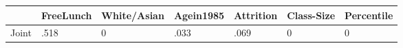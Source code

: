 \begin{table}[htbp]
\begin{tabular}{lllllll} \hline \hline
 & FreeLunch  & White/Asian  & Agein1985  & Attrition  & Class-Size  & Percentile  \\  \hline 
Joint & .518 & 0 & .033 & .069 & 0 & 0 \\  
\hline \hline \end{tabular}
\end{table}
